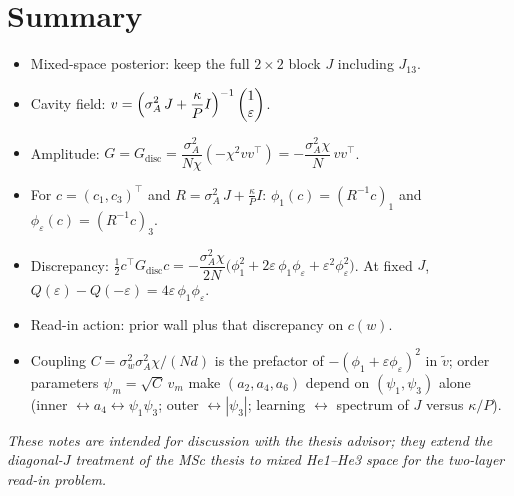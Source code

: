 \documentclass[11pt,a4paper]{article}
\begin{document}
\section{Summary}

\begin{itemize}
  \item Mixed-space posterior: keep the full $2\times 2$ block $J$ including $J_{13}$.
  \item Cavity field:
        $\displaystyle
        v
        =
        \Bigl(\sigma_A^2\, J+\frac{\kappa}{P}I\Bigr)^{-1}
        \begin{pmatrix}1\\\varepsilon\end{pmatrix}$.
  \item Amplitude:
        $G=G_{\mathrm{disc}}=\dfrac{\sigma_A^2}{N\chi}(-\chi^{2}vv^\top)
        =-\dfrac{\sigma_A^2\chi}{N}\,vv^\top$.
  \item For $c=(c_1,c_3)^\top$ and $R=\sigma_A^2\, J+\tfrac{\kappa}{P}I$:
        $\phi_1(c)=(R^{-1}c)_1$ and $\phi_\varepsilon(c)=(R^{-1}c)_3$.
  \item Discrepancy:
        $\tfrac12 c^\top G_{\mathrm{disc}}c
        =-\dfrac{\sigma_A^2\chi}{2N}
        \bigl(\phi_1^2+2\varepsilon\,\phi_1\phi_\varepsilon+\varepsilon^2\phi_\varepsilon^2\bigr)$.
        At fixed $J$, $Q(\varepsilon)-Q(-\varepsilon)=4\varepsilon\,\phi_1\phi_\varepsilon$.
  \item Read-in action: prior wall plus that discrepancy on $c(w)$.
  \item Coupling
        $C=\sigma_w^2\sigma_A^2\chi/(N d)$ is the prefactor of
        $-(\phi_1+\varepsilon\phi_\varepsilon)^2$ in
        $\tilde v$; order parameters $\psi_m=\sqrt{C}\,v_m$ make
        $(a_2,a_4,a_6)$ depend on $(\psi_1,\psi_3)$ alone
        (inner $\leftrightarrow a_4\leftrightarrow\psi_1\psi_3$;
        outer $\leftrightarrow|\psi_3|$;
        learning $\leftrightarrow$ spectrum of $J$ versus $\kappa/P$).
\end{itemize}

\vspace{1em}
\noindent\textit{These notes are intended for discussion with the thesis advisor; they
extend the diagonal-$J$ treatment of the MSc thesis to mixed He1--He3 space for the
two-layer read-in problem.}
\end{document}
